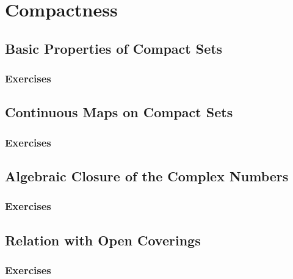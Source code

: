 \setcounter{chapter}{0}
\renewcommand{\thechapter}{8}
\chapter{Compactness}\label{ch:8}
\setcounter{equation}{0}	        %

\section{Basic Properties of Compact Sets}\label{sec:8.1}
\subsection*{Exercises}\label{sec:8.1_Exercises}
\section{Continuous Maps on Compact Sets}\label{sec:8.2}	
\subsection*{Exercises}\label{sec:8.2_Exercises}
\section{Algebraic Closure of the Complex Numbers}\label{sec:8.3}	
\subsection*{Exercises}\label{sec:8.3_Exercises}
\section{Relation with Open Coverings}\label{sec:8.4}	
\subsection*{Exercises}\label{sec:8.4_Exercises}
